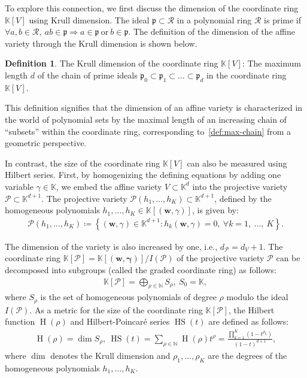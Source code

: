 \documentclass{article}
\theoremstyle{plain}
\theoremstyle{definition}
\newtheorem{definition}[theorem]{Definition}
\theoremstyle{remark}
\begin{document}
To explore this connection, we first discuss the dimension of the coordinate ring \(\mathbb{K}[V]\) using Krull dimension. The ideal \(\mathfrak{p} \subset \mathcal{R}\) in a polynomial ring \(\mathcal{R}\) is prime if \(\forall a,b \in \mathcal{R},\ ab \in \mathfrak{p} \Rightarrow a \in \mathfrak{p} \ \text{or} \ b \in \mathfrak{p} \). The definition of the dimension of the affine variety through the Krull dimension is shown below.
\begin{definition}
    The Krull dimension of the coordinate ring \(\mathbb{K}[V]\): The maximum length \(d\) of the chain of prime ideals \(\mathfrak{p}_0 \subset \mathfrak{p}_1 \subset \dots \subset \mathfrak{p}_d \) in the coordinate ring \(\mathbb{K}[V]\). 
\end{definition}
This definition signifies that the dimension of an affine variety is characterized in the world of polynomial sets by the maximal length of an increasing chain of ``subsets'' within the coordinate ring, corresponding to~\cref{def:max-chain} from a geometric perspective. 

In contrast, the size of the coordinate ring \(\mathbb{K}[V]\) can also be measured using Hilbert series. First, by homogenizing the defining equations by adding one variable \(\gamma \in \mathbb{K}\), we embed the affine variety \(V \subset \mathbb{K}^d\) into the projective variety \(\mathcal{P} \subset \mathbb{K}^{d+1}\). The projective variety \(\mathcal{P}(h_1, \ldots, h_K) \subset \mathbb{K}^{d+1}\), defined by the homogeneous polynomials \(h_1, \ldots, h_K \in \mathbb{K}[(\bm{w}, \gamma)]\), is given by:
\begin{gather*}
\mathcal{P}(h_1, \ldots, h_K) \coloneqq \left\{ (\bm{w}, \gamma) \in \mathbb{K}^{d+1} : h_k(\bm{w}, \gamma) = 0,\ \forall k = 1,\ \ldots,\ K \right\}.
\end{gather*}

The dimension of the variety is also increased by one, i.e., \(d_{\mathcal{P}} = d_V + 1\). The coordinate ring \(\mathbb{K}[\mathcal{P}] = \mathbb{K}[(\bm{w, \gamma})]/I(\mathcal{P})\) of the projective variety \(\mathcal{P}\) can be decomposed into subgroups (called the graded coordinate ring) as follows:
\begin{align*}
    \mathbb{K}[\mathcal{P}] = \bigoplus_{\rho \in \mathbb{N}} S_{\rho},\ S_0 = \mathbb{K},
\end{align*}
where \(S_{\rho}\) is the set of homogeneous polynomials of degree \(\rho\) modulo the ideal \(I(\mathcal{P})\).
As a metric for the size of the coordinate ring \(\mathbb{K}[\mathcal{P}]\), the Hilbert function \(\operatorname{H}(\rho)\) and Hilbert-Poincaré series \(\operatorname{HS}(t)\) are defined as follows:
\begin{align*}
    \operatorname{H}(\rho) = \dim S_{\rho},\ \operatorname{HS}(t) = \sum_{\rho \in \mathbb{N}} \operatorname{H}(\rho)t^\rho = \frac{\prod_{k=1}^{K} (1 - t^{\rho_{k}})}{(1-t)^{d+1}},
\end{align*}
where \(\dim\) denotes the Krull dimension and \(\rho_{1}, \ldots, \rho_{K}\) are the degrees of the homogeneous polynomials \(h_1, \ldots, h_K\).
\end{document}
